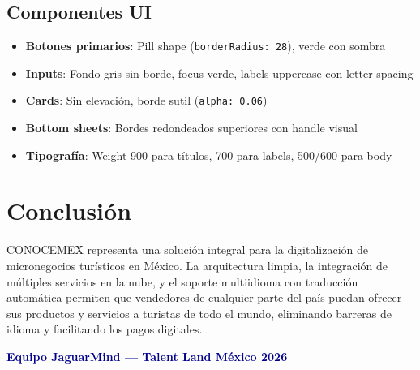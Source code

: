 \documentclass[12pt,a4paper]{article}
\begin{document}
\subsection{Componentes UI}

\begin{itemize}
    \item \textbf{Botones primarios}: Pill shape (\texttt{borderRadius: 28}), verde con sombra
    \item \textbf{Inputs}: Fondo gris sin borde, focus verde, labels uppercase con letter-spacing
    \item \textbf{Cards}: Sin elevaci\'on, borde sutil (\texttt{alpha: 0.06})
    \item \textbf{Bottom sheets}: Bordes redondeados superiores con handle visual
    \item \textbf{Tipograf\'ia}: Weight 900 para t\'itulos, 700 para labels, 500/600 para body
\end{itemize}

\section{Conclusi\'on}

CONOCEMEX representa una soluci\'on integral para la digitalizaci\'on de micronegocios tur\'isticos en M\'exico. La arquitectura limpia, la integraci\'on de m\'ultiples servicios en la nube, y el soporte multiidioma con traducci\'on autom\'atica permiten que vendedores de cualquier parte del pa\'is puedan ofrecer sus productos y servicios a turistas de todo el mundo, eliminando barreras de idioma y facilitando los pagos digitales.

\vspace{1cm}

\begin{center}
\textcolor{darkblue}{\textbf{Equipo JaguarMind --- Talent Land M\'exico 2026}}
\end{center}
\end{document}
